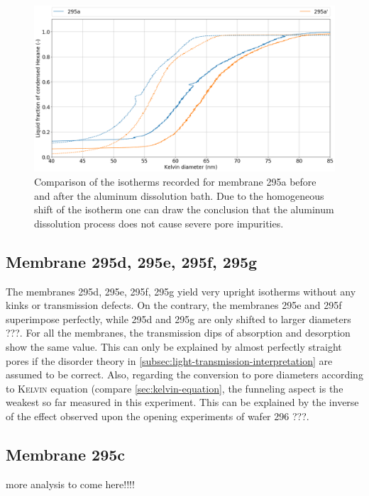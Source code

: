 \documentclass[thesis.tex]{subfiles}
\begin{document}
                \begin{figure}[ht]
                    \centering
                    \includegraphics[width=\textwidth]{images/295a'_vs_295a_d_kelvin.png}
                    \caption{Comparison of the isotherms recorded for membrane 295a before and after the aluminum dissolution bath. Due to the homogeneous shift of the isotherm one can draw the conclusion that the aluminum dissolution process does not cause severe pore impurities.}
                    \label{fig:295-al-before-after}
                \end{figure}


        \subsection{Membrane 295d, 295e, 295f, 295g}

            The membranes 295d, 295e, 295f, 295g yield very upright isotherms without any kinks or transmission defects. On the contrary, the membranes 295e and 295f superimpose perfectly, while 295d and 295g are only shifted to larger diameters ???. For all the membranes, the transmission dips of absorption and desorption show the same value. This can only be explained by almost perfectly straight pores if the disorder theory in \cref{subsec:light-transmission-interpretation} are assumed to be correct. Also, regarding the conversion to pore diameters according to \textsc{Kelvin} equation (compare \cref{sec:kelvin-equation}, the funneling aspect is the weakest so far measured in this experiment. This can be explained by the inverse of the effect observed upon the opening experiments of wafer 296 ???.


        \subsection{Membrane 295c}
        more analysis to come here!!!!
\end{document}
